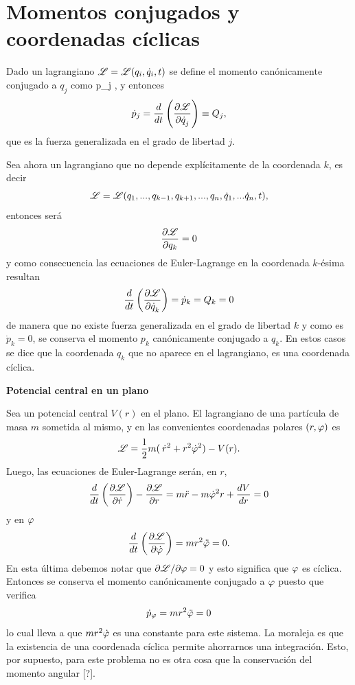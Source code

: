 \documentclass[10pt,oneside]{CBFT_book}
\begin{document}
\section{Momentos conjugados y coordenadas cíclicas}

Dado un lagrangiano $\mathscr{L} = \mathscr{L}( q_i,\dot{q}_i, t )$ se define el momento canónicamente conjugado a $q_j$
como 
\be
	p_j \equiv {},
	\label{mom_canon_conj}
\ee
y entonces 
\[
	\dot{p}_j = \frac{d}{dt}\left( \frac{\partial^{\hspace{-0.05em}} {\mathscr{L}}}{\partial {\dot{q}_j}^{\hspace{-0.05em}}} \right) \equiv Q_j,
\]
que es la fuerza generalizada en el grado de libertad $j$.

Sea ahora un lagrangiano que no depende explícitamente de la coordenada $k$, es decir 
\[
	\mathscr{L} = \mathscr{L}( q_1,...,q_{k-1},q_{k+1},...,q_n,\dot{q}_1,...\dot{q}_n, t ),
\]
entonces será
\[
	\frac{\partial^{\hspace{-0.05em}} {\mathscr{L}}}{\partial {q_k}^{\hspace{-0.05em}}}= 0 
\]
y como consecuencia las ecuaciones de Euler-Lagrange en la coordenada $k$-ésima resultan 
\[
	\frac{d^{\hspace{-0.05em}} {}}{d {t}^{\hspace{-0.05em}}}\left( \frac{\partial^{\hspace{-0.05em}} {\mathscr{L}}}{\partial {\dot{q}_k}^{\hspace{-0.05em}}} \right) = \dot{ p }_k = Q_k = 0 
\]
de manera que no existe fuerza generalizada en el grado de libertad $k$ y como es $\dot{p}_k = 0$, se conserva 
el momento $p_k$ canónicamente conjugado a $q_k$.
En estos casos se dice que la coordenada $q_k$ que no aparece en el lagrangiano, es una coordenada
cíclica.

\begin{ejemplo}{\bf Potencial central en un plano}

Sea un potencial central $ V(r) $ en el plano. El lagrangiano de una partícula de masa $m$ sometida al mismo,
y en las convenientes coordenadas polares $(r,\varphi)$ es
\[
	\mathscr{L} = \frac{1}{2} m ( \:\dot{r}^2 + r^2 \dot{\varphi}^2 ) - V(r).
\]
Luego, las ecuaciones de Euler-Lagrange serán, en $r$,
\[
	\frac{d^{\hspace{-0.05em}} {}}{d {t}^{\hspace{-0.05em}}}\left( \frac{\partial^{\hspace{-0.05em}} {\mathscr{L}}}{\partial {\dot{r}}^{\hspace{-0.05em}}}\right) - \frac{\partial^{\hspace{-0.05em}} {\mathscr{L}}}{\partial {r}^{\hspace{-0.05em}}} =
	m\ddot{r} - m\dot{\varphi}^2r + \frac{d^{\hspace{-0.05em}} {V}}{d {r}^{\hspace{-0.05em}}} = 0
\]
y en $\varphi$
\[
	\frac{d^{\hspace{-0.05em}} {}}{d {t}^{\hspace{-0.05em}}}\left( \frac{\partial^{\hspace{-0.05em}} {\mathscr{L}}}{\partial {\dot{\varphi}}^{\hspace{-0.05em}}}\right) = mr^2\ddot{\varphi} = 0.
\]
En esta última debemos notar que $\partial \mathscr{L} / \partial \varphi = 0 $ y esto significa que $\varphi$ es cíclica.
Entonces se conserva el momento canónicamente conjugado a $\varphi$ puesto que verifica 
\[
	\dot{p}_\varphi = mr^2\ddot{\varphi} = 0
\]
lo cual lleva a que $ m r^2\dot{\varphi} $ es una constante para este sistema. La moraleja es que la existencia de una 
coordenada cíclica permite ahorrarnos una integración.
Esto, por supuesto, para este problema no es otra cosa que la conservación del momento angular [?].

\end{ejemplo}
\end{document}
